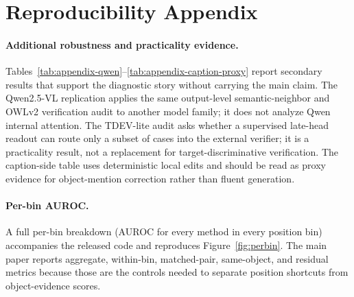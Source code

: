 \section{Reproducibility Appendix}
\label{sec:appendix}

\paragraph{Additional robustness and practicality evidence.}
Tables~\ref{tab:appendix-qwen}--\ref{tab:appendix-caption-proxy} report secondary results that support the diagnostic story without carrying the main claim. The Qwen2.5-VL replication applies the same output-level semantic-neighbor and OWLv2 verification audit to another model family; it does not analyze Qwen internal attention. The TDEV-lite audit asks whether a supervised late-head readout can route only a subset of cases into the external verifier; it is a practicality result, not a replacement for target-discriminative verification. The caption-side table uses deterministic local edits and should be read as proxy evidence for object-mention correction rather than fluent generation.





\paragraph{Per-bin AUROC.}
A full per-bin breakdown (AUROC for every method in every position bin) accompanies the released code and reproduces Figure~\ref{fig:perbin}. The main paper reports aggregate, within-bin, matched-pair, same-object, and residual metrics because those are the controls needed to separate position shortcuts from object-evidence scores.

